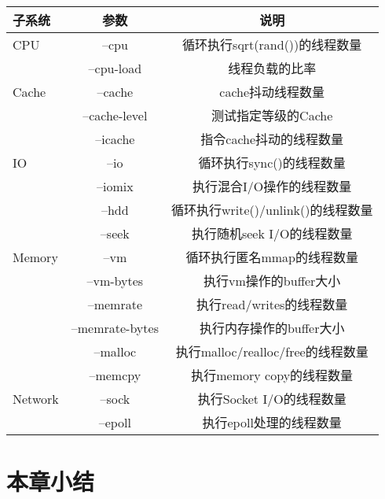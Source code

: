 \begin{table}
    \label{tab:metric_list}
    \footnotesize%
    \setlength{\tabcolsep}{4pt}%
    \renewcommand{\arraystretch}{1.5}%
    \centering
    \begin{tabular}{lcc}
        \hline
        子系统 & 参数 & 说明\\
        \hline
        CPU	    & --cpu	& 循环执行sqrt(rand())的线程数量\\
	            & --cpu-load & 线程负载的比率\\
        Cache	& --cache & cache抖动线程数量\\
	    & --cache-level	&测试指定等级的Cache\\
	    & --icache	&指令cache抖动的线程数量\\
        IO	    & --io	&循环执行sync()的线程数量\\
	            & --iomix	&执行混合I/O操作的线程数量\\
	            & --hdd	&循环执行write()/unlink()的线程数量\\
	            & --seek	&执行随机seek I/O的线程数量\\
        Memory	& --vm	&循环执行匿名mmap的线程数量\\
	            & --vm-bytes	&执行vm操作的buffer大小\\
	            & --memrate	&执行read/writes的线程数量\\
	            & --memrate-bytes	&执行内存操作的buffer大小\\
	            & --malloc	&执行malloc/realloc/free的线程数量\\
	            & --memcpy	&执行memory copy的线程数量\\
        Network	& --sock	&执行Socket I/O的线程数量\\
	            & --epoll	&执行epoll处理的线程数量\\
        \hline
    \end{tabular}
\end{table}

\section{本章小结}

